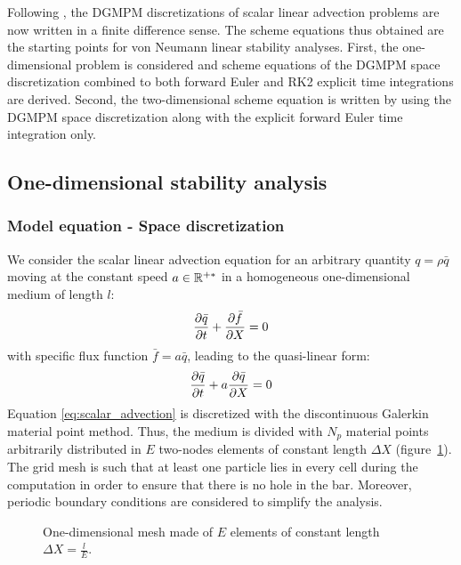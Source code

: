 Following \cite{Hirsch}, the DGMPM discretizations of scalar linear advection problems are now written in a finite difference sense. The scheme equations thus obtained are the starting points for von Neumann linear stability analyses. First, the one-dimensional problem is considered and scheme equations of the DGMPM space discretization combined to both forward Euler and RK2 explicit time integrations are derived. Second, the two-dimensional scheme equation is written by using the DGMPM space discretization along with the explicit forward Euler time integration only.

\subsection{One-dimensional stability analysis}
\label{subsec:scheme_equations}
\subsubsection*{Model equation - Space discretization}
We consider the scalar linear advection equation for an arbitrary quantity $q=\rho \bar{q}$ moving at the constant speed $a \in \mathbb{R}^{+*}$ in a homogeneous one-dimensional medium of length $l$:
\begin{equation}
\frac{\partial \bar{q}}{\partial t} + \frac{\partial \bar{f}}{\partial X} = 0 
\end{equation}
with specific flux function $\bar{f} = a\bar{q}$, leading to the quasi-linear form:
\begin{equation}
\frac{\partial \bar{q}}{\partial t} + a\frac{\partial \bar{q}}{\partial X} = 0 \label{eq:scalar_advection}
\end{equation}
Equation \eqref{eq:scalar_advection} is discretized with the discontinuous Galerkin material point method. Thus, the medium is divided with $N_p$ material points arbitrarily distributed in $E$ two-nodes elements of constant length $\Delta X$ (figure~\ref{fig:1Dmesh}). The grid mesh is such that at least one particle lies in every cell during the computation in order to ensure that there is no hole in the bar. Moreover, periodic boundary conditions are considered to simplify the analysis.
\begin{figure}[h!]
  \centering
  
  \caption{One-dimensional mesh made of $E$ elements of constant length $\Delta X = \frac{l}{E}$.}\label{fig:1Dmesh}
\end{figure}

